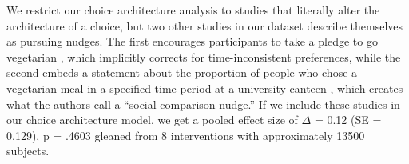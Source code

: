 \documentclass[sn-nature,pdflatex]{sn-jnl}
\begin{document}
We restrict our choice architecture analysis to studies that literally
alter the architecture of a choice, but two other studies in our dataset
describe themselves as pursuing nudges. The first encourages
participants to take a pledge to go vegetarian \citep{banerjee2019},
which implicitly corrects for time-inconsistent preferences, while the
second embeds a statement about the proportion of people who chose a
vegetarian meal in a specified time period at a university canteen
\citep{griesoph2021}, which creates what the authors call a ``social
comparison nudge.'' If we include these studies in our choice
architecture model, we get a pooled effect size of \(\Delta\) = 0.12 (SE
= 0.129), p = .4603 gleaned from 8 interventions with approximately
13500 subjects.

\begin{comment} maybe say something about Had our search extended to 2024, we would have likely included many more studies, many of which find small or null effects [cite]

\subsection{Health studies work better for RPM than for
MAP}\label{sec2.6}

The pooled effect size for persuasion studies with a health component is
\(\Delta\) = 0.082 (SE = 0.039), p = .0634. This is small and not
significant, albeit larger than the overall pooled effect.

Health appeals are a component of 19 of 25 interventions aimed at
reducing RPM consumption, and are generally more effective there:
\(\Delta\) = 0.26 (SE = 0.065), p = .0015. This fits with the broader
context where official nutritional guidelines typically encourage
consumers to reduce RPM and consume moderate amounts of lean meat and
fish.

We also judge many health studies to be at elevated risk of
self-reporting bias. For example, one study seeks to induce a sense of
fear in subjects \citep{berndsen2005}, while others target people who
are at risk of cancer \citep{hatami2018} or cancer survivors
\citep{james2015, lee2018} with reasons they should change their diet,
and then ask subjects to self-report what they have eaten recently.

\subsection{Environmental appeals have modest positive
effects}\label{sec2.7}


\end{comment}
\end{document}

